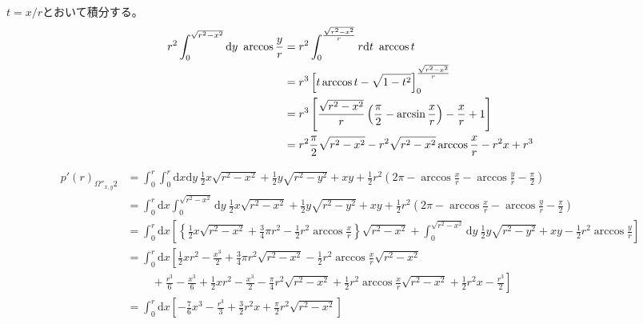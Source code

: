 \documentclass[letterpaper,10pt,english]{sphinxmanual}
\begin{document}
\(t = x/r\)とおいて積分する。
\begin{gather}
\begin{split}\begin{align}
r^{2}\int^{\sqrt{r^{2}-x^{2}}}_{0}\mathrm{d}y\ \arccos \frac{y}{r} &= r^{2}\int^{\frac{\sqrt{r^{2}-x^{2}}}{r}}_{0}r\mathrm{d}t\ \arccos t\\
&= r^{3}\left[ t\arccos t - \sqrt{1-t^{2}} \right]^{\frac{\sqrt{r^{2}-x^{2}}}{r}}_{0}\\
&= r^{3}\left[ \frac{\sqrt{r^{2}-x^{2}}}{r}\left( \frac{\pi}{2} - \arcsin \frac{x}{r} \right) - \frac{x}{r} + 1 \right]\\
&= r^{2}\frac{\pi}{2}\sqrt{r^{2}-x^{2}} - r^{2}\sqrt{r^{2}-x^{2}}\arccos\frac{x}{r} - r^{2}x + r^{3}
\end{align}\end{split}\notag
\end{gather}\begin{gather}
\begin{split}\begin{align}
p'(r)_{\Omega''_{x, y}2} &= \int^{r}_{0}\int^{r}_{0}\mathrm{d}x\mathrm{d}y\ \frac{1}{2}x\sqrt{r^{2}-x^{2}} + \frac{1}{2}y\sqrt{r^{2} -y^{2}} + xy + \frac{1}{2}r^{2}\left( 2\pi - \arccos\frac{x}{r} - \arccos\frac{y}{r} - \frac{\pi}{2} \right)\\
&= \int^{r}_{0}\mathrm{d}x\int^{\sqrt{r^{2}-x^{2}}}_{0}\mathrm{d}y\ \frac{1}{2}x\sqrt{r^{2}-x^{2}} + \frac{1}{2}y\sqrt{r^{2} -y^{2}} + xy + \frac{1}{2}r^{2}\left( 2\pi - \arccos\frac{x}{r} - \arccos\frac{y}{r} - \frac{\pi}{2} \right)\\
&= \int^{r}_{0}\mathrm{d}x\left[ \left\{ \frac{1}{2}x\sqrt{r^{2}-x^{2}} + \frac{3}{4}\pi r^{2} - \frac{1}{2}r^{2}\arccos\frac{x}{r} \right\}\sqrt{r^{2}-x^{2}} + \int^{\sqrt{r^{2}-x^{2}}}_{0}\mathrm{d}y\ \frac{1}{2}y\sqrt{r^{2}-y^{2}} + xy - \frac{1}{2}r^{2}\arccos\frac{y}{r}\right]\\
&= \int^{r}_{0}\mathrm{d}x\left[ \frac{1}{2}xr^{2} - \frac{x^{3}}{2} + \frac{3}{4}\pi r^{2}\sqrt{r^{2}-x^{2}} - \frac{1}{2}r^{2}\arccos \frac{x}{r} \sqrt{r^{2}-x^{2}} \right.\\
&\ \ \ \ \ \ \ \ \ \ + \left. \frac{r^{3}}{6} - \frac{x^{3}}{6} + \frac{1}{2}xr^{2} - \frac{x^{3}}{2} - \frac{\pi}{4}r^{2}\sqrt{r^{2}-x^{2}} + \frac{1}{2}r^{2}\arccos\frac{x}{r}\sqrt{r^{2}-x^{2}} + \frac{1}{2}r^{2}x - \frac{r^{3}}{2}\right] \\
&= \int^{r}_{0}\mathrm{d}x\left[- \frac{7}{6}x^{3} - \frac{r^{3}}{3} + \frac{3}{2}r^{2}x + \frac{\pi}{2}r^{2}\sqrt{r^{2}-x^{2}} \right]\\

\end{align}
\end{split}
\end{gather}
\end{document}
